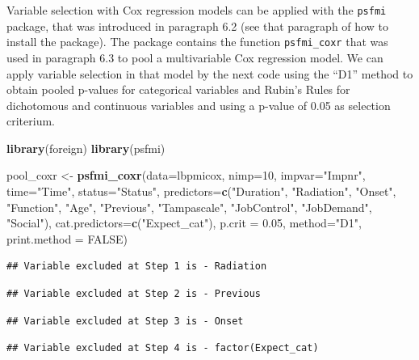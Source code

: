 \documentclass[
]{book}
\newenvironment{Shaded}{\begin{snugshade}}{\end{snugshade}}
\newcommand{\DataTypeTok}[1]{\textcolor[rgb]{0.13,0.29,0.53}{#1}}
\newcommand{\DecValTok}[1]{\textcolor[rgb]{0.00,0.00,0.81}{#1}}
\newcommand{\FloatTok}[1]{\textcolor[rgb]{0.00,0.00,0.81}{#1}}
\newcommand{\KeywordTok}[1]{\textcolor[rgb]{0.13,0.29,0.53}{\textbf{#1}}}
\newcommand{\NormalTok}[1]{#1}
\newcommand{\OtherTok}[1]{\textcolor[rgb]{0.56,0.35,0.01}{#1}}
\newcommand{\StringTok}[1]{\textcolor[rgb]{0.31,0.60,0.02}{#1}}
\begin{document}
Variable selection with Cox regression models can be applied with the
\texttt{psfmi} package, that was introduced in paragraph 6.2 (see that
paragraph of how to install the package). The package contains the
function \texttt{psfmi\_coxr} that was used in paragraph 6.3 to pool a
multivariable Cox regression model. We can apply variable selection in
that model by the next code using the ``D1'' method to obtain pooled
p-values for categorical variables and Rubin's Rules for dichotomous and
continuous variables and using a p-value of 0.05 as selection criterium.

\begin{Shaded}
\begin{Highlighting}[]
\KeywordTok{library}\NormalTok{(foreign)}
\KeywordTok{library}\NormalTok{(psfmi)}

\NormalTok{pool_coxr <-}\StringTok{ }\KeywordTok{psfmi_coxr}\NormalTok{(}\DataTypeTok{data=}\NormalTok{lbpmicox, }\DataTypeTok{nimp=}\DecValTok{10}\NormalTok{, }\DataTypeTok{impvar=}\StringTok{"Impnr"}\NormalTok{, }\DataTypeTok{time=}\StringTok{"Time"}\NormalTok{, }\DataTypeTok{status=}\StringTok{"Status"}\NormalTok{,}
  \DataTypeTok{predictors=}\KeywordTok{c}\NormalTok{(}\StringTok{"Duration"}\NormalTok{, }\StringTok{"Radiation"}\NormalTok{, }\StringTok{"Onset"}\NormalTok{, }\StringTok{"Function"}\NormalTok{, }\StringTok{"Age"}\NormalTok{,}
  \StringTok{"Previous"}\NormalTok{, }\StringTok{"Tampascale"}\NormalTok{, }\StringTok{"JobControl"}\NormalTok{, }\StringTok{"JobDemand"}\NormalTok{, }\StringTok{"Social"}\NormalTok{), }
  \DataTypeTok{cat.predictors=}\KeywordTok{c}\NormalTok{(}\StringTok{"Expect_cat"}\NormalTok{), }\DataTypeTok{p.crit =} \FloatTok{0.05}\NormalTok{, }\DataTypeTok{method=}\StringTok{"D1"}\NormalTok{, }\DataTypeTok{print.method =} \OtherTok{FALSE}\NormalTok{)}
\end{Highlighting}
\end{Shaded}

\begin{verbatim}
## Variable excluded at Step 1 is - Radiation
\end{verbatim}

\begin{verbatim}
## Variable excluded at Step 2 is - Previous
\end{verbatim}

\begin{verbatim}
## Variable excluded at Step 3 is - Onset
\end{verbatim}

\begin{verbatim}
## Variable excluded at Step 4 is - factor(Expect_cat)
\end{verbatim}
\end{document}
